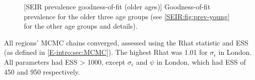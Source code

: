 \documentclass[thesis.tex]{subfiles}
\begin{document}
\begin{figure}
    \vspace{-3cm}
    \captionsetup{width=0.8\paperwidth}
    [SEIR prevalence goodness-of-fit (older ages)]{%
        Goodness-of-fit prevalence for the older three age groups (see \cref{SEIR:fig:prev-young} for the other age groups and details).
    }
    \label{SEIR:fig:prev-old}
\end{figure}

All regions' MCMC chains converged, assessed using the Rhat statistic and ESS (as defined in \cref{E-intro:sec:MCMC}).
The highest Rhat was 1.01 for $\sigma_\epsilon$ in London.
All parameters had ESS > 1000, except $\sigma_\epsilon$ and $\psi$ in London, which had ESS of 450 and 950 respectively.
\end{document}
